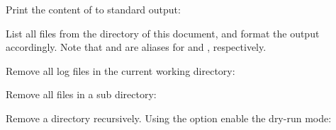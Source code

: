 \begin{flushleft}
\end{flushleft}

\begin{flushleft}
	Print the content of  to standard output:
\end{flushleft}

\begin{flushleft}
\end{flushleft}

\begin{flushleft}
	List all  files from the  directory of this document,
	and format the output accordingly. Note that  and  are
	aliases for  and , respectively.
\end{flushleft}

\begin{flushleft}
\end{flushleft}

\begin{flushleft}
	Remove all log files in the current working directory:
\end{flushleft}

\begin{flushleft}
\end{flushleft}

\begin{flushleft}
	Remove all  files in a sub directory:
\end{flushleft}

\begin{flushleft}
\end{flushleft}

\begin{flushleft}
	Remove a directory recursively. Using the  option enable the dry-run
	mode:
\end{flushleft}

\begin{flushleft}
\end{flushleft}
